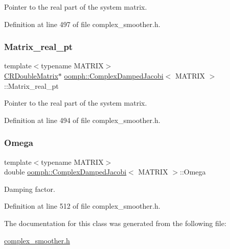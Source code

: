 Pointer to the real part of the system matrix. 



Definition at line 497 of file complex\+\_\+smoother.\+h.

\mbox{\label{classoomph_1_1ComplexDampedJacobi_aad28f093e125e259fb34b0c33269ec04}} 
\subsubsection{\texorpdfstring{Matrix\+\_\+real\+\_\+pt}{Matrix\_real\_pt}}
{\footnotesize\ttfamily template$<$typename M\+A\+T\+R\+IX$>$ \\
\hyperlink{classoomph_1_1CRDoubleMatrix}{C\+R\+Double\+Matrix}$\ast$ \hyperlink{classoomph_1_1ComplexDampedJacobi}{oomph\+::\+Complex\+Damped\+Jacobi}$<$ M\+A\+T\+R\+IX $>$\+::Matrix\+\_\+real\+\_\+pt\hspace{0.3cm}{\ttfamily [private]}}



Pointer to the real part of the system matrix. 



Definition at line 494 of file complex\+\_\+smoother.\+h.

\mbox{\label{classoomph_1_1ComplexDampedJacobi_a735337bf7a2a9d3f2265d8c5eaf74850}} 
\subsubsection{\texorpdfstring{Omega}{Omega}}
{\footnotesize\ttfamily template$<$typename M\+A\+T\+R\+IX$>$ \\
double \hyperlink{classoomph_1_1ComplexDampedJacobi}{oomph\+::\+Complex\+Damped\+Jacobi}$<$ M\+A\+T\+R\+IX $>$\+::Omega\hspace{0.3cm}{\ttfamily [private]}}



Damping factor. 



Definition at line 512 of file complex\+\_\+smoother.\+h.



The documentation for this class was generated from the following file\+:\begin{DoxyCompactItemize}
\item 
\hyperlink{complex__smoother_8h}{complex\+\_\+smoother.\+h}\end{DoxyCompactItemize}
